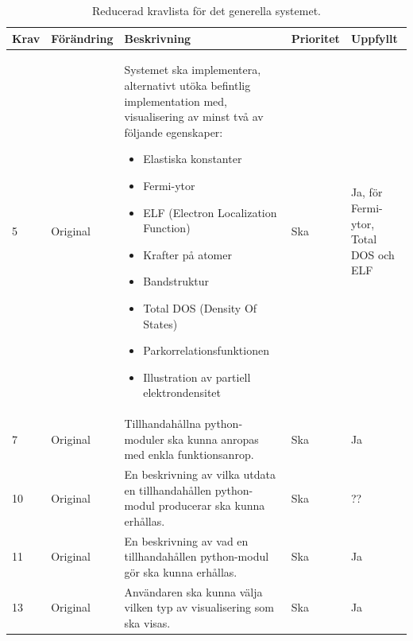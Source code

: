 \documentclass[a4paper,12pt]{article}
\begin{document}
\begin{table}[H]
\caption{Reducerad kravlista för det generella systemet.}
\begin{center}
\begin{tabular}{ |p{10mm}|p{20mm}|p{70mm}|p{15mm}|p{15mm}|}
\hline
 \textbf{Krav} & \textbf{Förändring} & \textbf{Beskrivning} & \textbf{Prioritet} & \textbf{Uppfyllt}  \\ 
\hline
 5 & Original & Systemet ska implementera, alternativt utöka befintlig implementation med, visualisering av minst två av följande egenskaper:
  \begin{itemize}
  \item Elastiska konstanter
  \item Fermi-ytor
  \item ELF (Electron Localization Function)
  \item Krafter på atomer
  \item Bandstruktur
  \item Total DOS (Density Of States)
  \item Parkorrelationsfunktionen
  \item Illustration av partiell elektrondensitet
  \end{itemize} & Ska & Ja, för Fermi-ytor, Total DOS och ELF \\
\hline
7 & Original & Tillhandahållna python-moduler ska kunna anropas med enkla funktionsanrop. & Ska & Ja \\
\hline
10 & Original & En beskrivning av vilka utdata en tillhandahållen python-modul producerar ska kunna erhållas. & Ska & ?? \\
\hline
11 & Original & En beskrivning av vad en tillhandahållen python-modul gör ska kunna erhållas. & Ska & Ja \\
\hline
13 & Original & Användaren ska kunna välja vilken typ av visualisering som ska visas. & Ska & Ja \\

\end{tabular}
\end{center}
\end{table}
\end{document}
